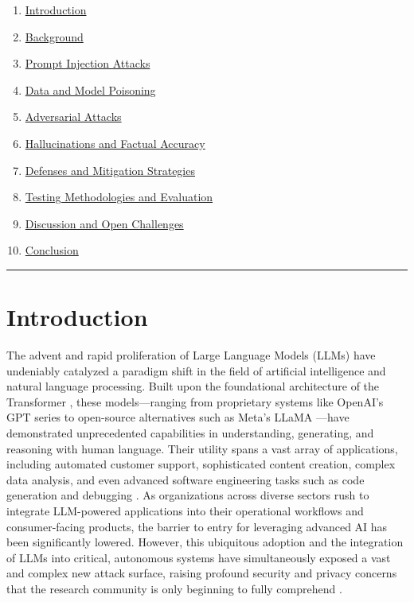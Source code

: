 \documentclass[11pt,a4paper]{article}
\begin{document}
\begin{enumerate}
  \item \href{#introduction}{Introduction}
  \item \href{#background}{Background}
  \item \href{#prompt-injection-attacks}{Prompt Injection Attacks}
  \item \href{#data-and-model-poisoning}{Data and Model Poisoning}
  \item \href{#adversarial-attacks}{Adversarial Attacks}
  \item \href{#hallucinations-and-factual-accuracy}{Hallucinations and Factual Accuracy}
  \item \href{#defenses-and-mitigation-strategies}{Defenses and Mitigation Strategies}
  \item \href{#testing-methodologies-and-evaluation}{Testing Methodologies and Evaluation}
  \item \href{#discussion-and-open-challenges}{Discussion and Open Challenges}
  \item \href{#conclusion}{Conclusion}
\end{enumerate}
\noindent\rule{\textwidth}{0.4pt}
\section{Introduction}

The advent and rapid proliferation of Large Language Models (LLMs) have undeniably catalyzed a paradigm shift in the field of artificial intelligence and natural language processing. Built upon the foundational architecture of the Transformer \cite{Vaswani_2017_Attention}, these models---ranging from proprietary systems like OpenAI's GPT series \cite{Brown_2020_Language, OpenAI_2023_GPT4} to open-source alternatives such as Meta's LLaMA \cite{Touvron_2023_Llama}---have demonstrated unprecedented capabilities in understanding, generating, and reasoning with human language. Their utility spans a vast array of applications, including automated customer support, sophisticated content creation, complex data analysis, and even advanced software engineering tasks such as code generation and debugging \cite{Chen_2021_Evaluating}. As organizations across diverse sectors rush to integrate LLM-powered applications into their operational workflows and consumer-facing products, the barrier to entry for leveraging advanced AI has been significantly lowered. However, this ubiquitous adoption and the integration of LLMs into critical, autonomous systems have simultaneously exposed a vast and complex new attack surface, raising profound security and privacy concerns that the research community is only beginning to fully comprehend \cite{Bommasani_2021_Opportunities}.
\end{document}
